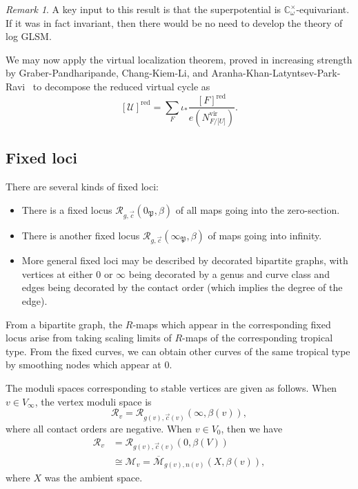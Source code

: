 \documentclass[10pt,oldfontcommands,oneside]{memoir}
\theoremstyle{definition}
\theoremstyle{remark}
\newtheorem{rmk}[thm]{Remark}
\theoremstyle{plain}
\theoremstyle{definition}
\theoremstyle{remark}
\newcommand{\C}{\mathbb{C}}
\newcommand{\Mbar}{\overline{\mathcal{M}}}
\newcommand{\mc}[1]{\mathcal{#1}}
\newcommand{\mf}[1]{\mathfrak{#1}}
\newcommand{\mr}[1]{\mathrm{#1}}
\newcommand{\1}{\mathbf{1}}
\newcommand{\2}{\mathbf{2}}
\newcommand{\3}{\mathbf{3}}
\newcommand{\vir}{\mr{vir}}
\newcommand{\red}{\mr{red}}
\begin{document}
\begin{rmk}
    A key input to this result is that the superpotential is $\C_{\omega}^{\times}$-equivariant. If it was in fact invariant, then there would be no need to develop the theory of log GLSM.
\end{rmk}

We may now apply the virtual localization theorem, proved in increasing strength by Graber-Pandharipande, Chang-Kiem-Li, and Aranha-Khan-Latyntsev-Park-Ravi~\cite{virtloc,locwccosection,virtloc2} to decompose the reduced virtual cycle as
\[ [\mc{U}]^{\red} = \sum_F \iota_* \frac{[F]^{\red}}{e(N_{F/\mc[U]}^{\vir})}. \]


\subsection{Fixed loci}%
\label{sub:Fixed loci}

There are several kinds of fixed loci:
\begin{itemize}
    \item There is a fixed locus $\mc{R}_{g,\vec{c}}(0_{\mf{P}}, \beta)$ of all maps going into the zero-section.
    \item There is another fixed locus $\mc{R}_{g,\vec{c}}(\infty_{\mf{P}}, \beta)$ of maps going into infinity.
    \item More general fixed loci may be described by decorated bipartite graphs, with vertices at either $0$ or $\infty$ being decorated by a genus and curve class and edges being decorated by the contact order (which implies the degree of the edge).
\end{itemize}
From a bipartite graph, the $R$-maps which appear in the corresponding fixed locus arise from taking scaling limits of $R$-maps of the corresponding tropical type. From the fixed curves, we can obtain other curves of the same tropical type by smoothing nodes which appear at $0$.

The moduli spaces corresponding to stable vertices are given as follows. When $v \in V_{\infty}$, the vertex moduli space is
\[ \mc{R}_v = \mc{R}_{g(v), \vec{c}(v)}(\infty, \beta(v)), \]
where all contact orders are negative. When $v \in V_0$, then we have
\begin{align*}
    \mc{R}_v &= \mc{R}_{g(v), \vec{c}(v)}(0, \beta(V)) \\
    &\cong \mc{M}_v = \Mbar_{g(v), n(v)} (X, \beta(v)),
\end{align*}
where $X$ was the ambient space.
\end{document}
